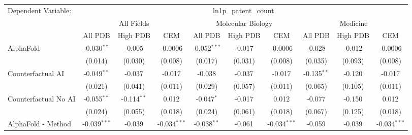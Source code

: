 \begingroup
\centering
\begin{tabular}{lccccccccc}
   \tabularnewline \midrule \midrule
   Dependent Variable: & \multicolumn{9}{c}{ln1p\_patent\_count}\\
 & \multicolumn{3}{c}{All Fields} & \multicolumn{3}{c}{Molecular Biology} & \multicolumn{3}{c}{Medicine} \\
\cmidrule(lr){2-7} \cmidrule(lr){5-10} \cmidrule(lr){8-7}
 & \multicolumn{1}{c}{All PDB} & \multicolumn{1}{c}{High PDB} & \multicolumn{1}{c}{CEM} & \multicolumn{1}{c}{All PDB} & \multicolumn{1}{c}{High PDB} & \multicolumn{1}{c}{CEM} & \multicolumn{1}{c}{All PDB} & \multicolumn{1}{c}{High PDB} & \multicolumn{1}{c}{CEM} \\
\cmidrule(lr){2-3} \cmidrule(lr){3-4} \cmidrule(lr){4-5} \cmidrule(lr){5-6} \cmidrule(lr){6-7} \cmidrule(lr){7-8} \cmidrule(lr){8-9} \cmidrule(lr){9-10} \cmidrule(lr){10-3}
   AlphaFold                                                   & -0.030$^{**}$  & -0.005        & -0.0006        & -0.052$^{***}$ & -0.017       & -0.0006        & -0.028        & -0.012        & -0.0006\\   
                                                               & (0.014)        & (0.030)       & (0.008)        & (0.017)        & (0.031)      & (0.008)        & (0.035)       & (0.093)       & (0.008)\\   
   Counterfactual AI                                           & -0.049$^{**}$  & -0.037        & -0.017         & -0.038         & -0.037       & -0.017         & -0.135$^{**}$ & -0.120        & -0.017\\   
                                                               & (0.021)        & (0.041)       & (0.011)        & (0.029)        & (0.057)      & (0.011)        & (0.065)       & (0.105)       & (0.011)\\   
   Counterfactual No AI                                        & -0.055$^{**}$  & -0.114$^{**}$ & 0.012          & -0.047$^{*}$   & -0.017       & 0.012          & -0.077        & -0.150        & 0.012\\   
                                                               & (0.024)        & (0.055)       & (0.018)        & (0.024)        & (0.061)      & (0.018)        & (0.067)       & (0.125)       & (0.018)\\   
   AlphaFold - Method                                          & -0.039$^{***}$ & -0.039        & -0.034$^{***}$ & -0.038$^{**}$  & -0.061       & -0.034$^{***}$ & -0.059        & -0.039        & -0.034$^{***}$\\   

\end{tabular}
